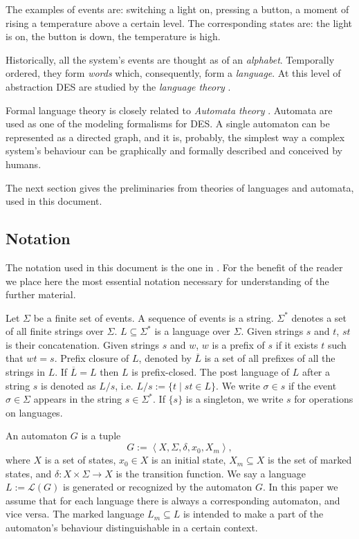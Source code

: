 The examples of events are: switching a light on, pressing a button, a 
moment of rising a temperature above a certain level. The corresponding states
are: the light is on, the button is down, the temperature is high.

Historically, all the system's events are thought as of an \emph{alphabet}.
Temporally ordered, they form \emph{words} which, consequently, form a
\emph{language}. At this level of abstraction DES are studied by the
\emph{language theory} \cite{aho_theory_1968}.

Formal language theory is closely related to \emph{Automata theory}
\cite{hopcroft_introduction_2007}. Automata are used as one of the modeling
formalisms for DES. A single automaton can be represented as a directed graph,
and it is, probably, the simplest way a complex system's behaviour can be graphically
and formally described and conceived by humans.

The next section gives the preliminaries from theories of languages and
automata, used in this document.


\subsection{Notation}

The notation used in this document is the one in
\cite{cassandras_introduction_2010}. For the benefit of the reader we place here
the most essential notation necessary for understanding of the further material.

Let $\Sigma$ be a finite set of events. A sequence of events is a string.
$\Sigma^*$ denotes a set of all finite strings over $\Sigma$.
$L\subseteq\Sigma^*$ is a language over $\Sigma$. Given strings $s$ and $t$,
$st$ is their concatenation. Given strings $s$ and $w$, $w$ is a prefix of $s$
if it exists $t$ such that $wt = s$. Prefix closure of $L$, denoted by
$\overline{L}$ is a set of all prefixes of all the strings in $L$.
If $\overline{L} = L$ then $L$ is prefix-closed. The post language of $L$ after
a string $s$ is denoted as $L/s$, i.e. $L/s := \{t\mid st \in L\}$. We
write $\sigma \in s$ if the event $\sigma \in \Sigma$ appears in the string $s
\in \Sigma^*$. If $\{s\}$ is a singleton, we write $s$ for operations on
languages.

An automaton $G$ is a tuple $$G := \left< X,\Sigma,\delta,x_0, X_m \right>,$$
where $X$ is a set of states, $x_0 \in X$ is an initial state, $X_m \subseteq X$
is the set of marked states, and $\delta: X \times \Sigma \rightarrow X$ is the
transition function.
We say a language $L := \mathcal{L}(G)$ is generated or recognized by the
automaton $G$. In this paper we assume that for each language there is always a
corresponding automaton, and vice versa. The marked language $L_m \subseteq L$
is intended to make a part of the automaton's behaviour distinguishable in a
certain context.

